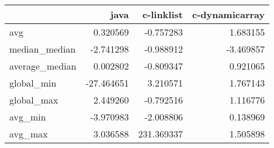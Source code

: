 \begin{tabular}{lrrr}
\toprule
{} &       java &  c-linklist &  c-dynamicarray \\
\midrule
avg            &   0.320569 &   -0.757283 &        1.683155 \\
median\_median  &  -2.741298 &   -0.988912 &       -3.469857 \\
average\_median &   0.002802 &   -0.809347 &        0.921065 \\
global\_min     & -27.464651 &    3.210571 &        1.767143 \\
global\_max     &   2.449260 &   -0.792516 &        1.116776 \\
avg\_min        &  -3.970983 &   -2.008806 &        0.138969 \\
avg\_max        &   3.036588 &  231.369337 &        1.505898 \\
\bottomrule
\end{tabular}
